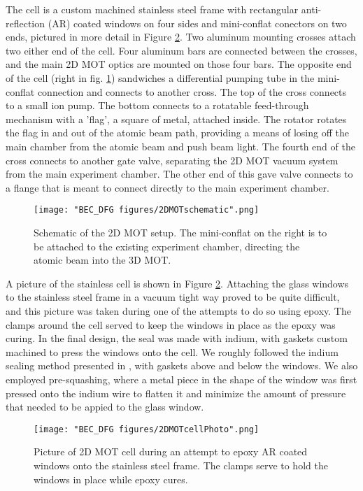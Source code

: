 The cell is a custom machined stainless steel frame with rectangular anti-reflection (AR) coated windows on four sides and mini-conflat conectors on two ends, pictured in more detail in Figure \ref{fig:2DMOTcellPhoto}. Two aluminum mounting crosses attach two either end of the cell. Four aluminum bars are connected between the crosses, and the main 2D MOT optics are mounted on those four bars. The opposite end of the cell (right in fig. \ref{fig:2DMOTschematic}) sandwiches a differential pumping tube in the mini-conflat connection and connects to another cross. The top of the cross connects to a small ion pump. The bottom connects to a rotatable feed-through mechanism with a 'flag', a square of metal, attached inside. The rotator rotates the flag in and out of the atomic beam path, providing a means of losing off the main chamber from the atomic beam and push beam light. The fourth end of the cross connects to another gate valve, separating the 2D MOT vacuum system from the main experiment chamber. The other end of this gave valve connects to a flange that is meant to connect directly to the main experiment chamber.  


\begin{figure}
	\texttt{[image: "BEC\_DFG figures/2DMOTschematic".png]}
\caption[Schematic of the 2D MOT setup]{Schematic of the 2D MOT setup. The mini-conflat on the right is to be attached to the existing experiment chamber, directing the atomic beam into the 3D MOT. }
\label{fig:2DMOTschematic}
\end{figure}

A picture of the stainless cell is shown in Figure \ref{fig:2DMOTcellPhoto}. Attaching the glass windows to the stainless steel frame in a vacuum tight way proved to be quite difficult, and this picture was taken during one of the attempts to do so using epoxy. The clamps around the cell served to keep the windows in place as the epoxy was curing. In the final design, the seal was made with indium, with gaskets custom machined to press the windows onto the cell. We roughly followed the indium sealing method presented in \cite{Weatherill2009}, with gaskets above and below the windows. We also employed pre-squashing, where a metal piece in the shape of the window was first pressed onto the indium wire to flatten it and minimize the amount of pressure that needed to be appied to the glass window.  
\begin{figure}
	\texttt{[image: "BEC\_DFG figures/2DMOTcellPhoto".png]}
\caption[Picture of 2D MOT cell]{Picture of 2D MOT cell during an attempt to epoxy AR coated windows onto the stainless steel frame. The clamps serve to hold the windows in place while epoxy cures.}
\label{fig:2DMOTcellPhoto}
\end{figure}

